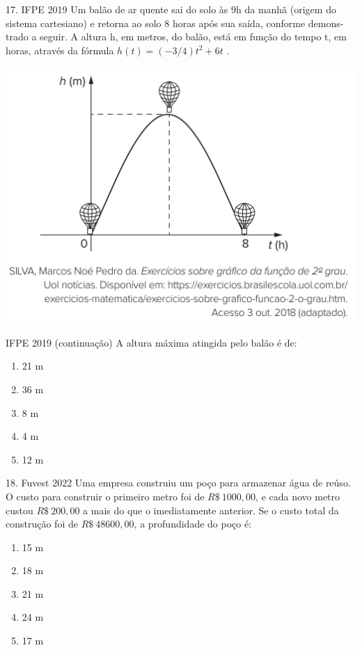 \documentclass[11pt]{beamer}
\begin{document}
\begin{frame}{17. IFPE 2019}
    Um balão de ar quente sai do solo às 9h da manhã (origem do sistema cartesiano) e retorna ao solo 8 horas após sua saída, conforme demons- trado a seguir. A altura h, em metros, do balão, está em função do tempo t, em horas, através da fórmula $h(t)=(-{3}/{4})t^{2}+6t$ .

    \begin{center}
        \includegraphics[scale=0.5]{imagens/IFPE 2019.png}
    \end{center}
\end{frame}

\begin{frame}{IFPE 2019 (continuação)}
    A altura máxima atingida pelo balão é de:

    \begin{enumerate}[a]
        \item 21 m %
        \item 36 m
        \item 8 m 
        \item 4 m
        \item 12 m
    \end{enumerate}
\end{frame}

\begin{frame}{18. Fuvest 2022}
    Uma empresa construiu um poço para armazenar água de reúso. O custo para construir o primeiro metro foi de $R\$\ 1 000,00$, e cada novo metro custou $R\$\ 200,00$ a mais do que o imediatamente anterior. Se o custo total da construção foi de $R\$\ 48 600,00$, a profundidade do poço é:

    \begin{enumerate}[a]
        \item 15 m
        \item 18 m %
        \item 21 m
        \item 24 m
        \item 17 m
    \end{enumerate}
\end{frame}
\end{document}
